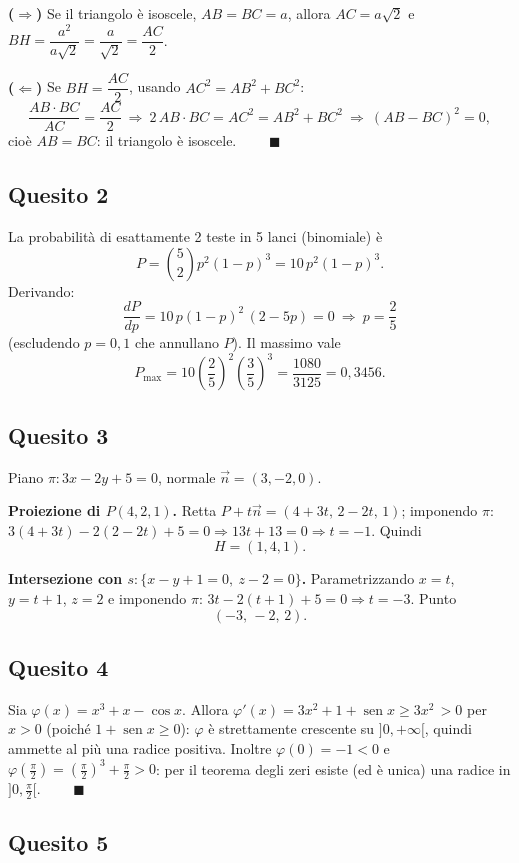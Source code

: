 \documentclass[11pt]{article}
\DeclareMathOperator{\sen}{sen}
\begin{document}
\textbf{($\Rightarrow$)} Se il triangolo \`e isoscele, $AB=BC=a$, allora
$AC=a\sqrt2$ e $BH=\dfrac{a^2}{a\sqrt2}=\dfrac{a}{\sqrt2}=\dfrac{AC}{2}$.

\textbf{($\Leftarrow$)} Se $BH=\dfrac{AC}{2}$, usando $AC^2=AB^2+BC^2$:
\[
\frac{AB\cdot BC}{AC}=\frac{AC}{2}
\ \Longrightarrow\ 2\,AB\cdot BC=AC^2=AB^2+BC^2
\ \Longrightarrow\ (AB-BC)^2=0,
\]
cio\`e $AB=BC$: il triangolo \`e isoscele. $\qquad\blacksquare$

\subsection*{Quesito 2}

La probabilit\`a di esattamente 2 teste in 5 lanci (binomiale) \`e
\[
P=\binom{5}{2}p^2(1-p)^3=10\,p^2(1-p)^3.
\]
Derivando:
\[
\frac{dP}{dp}=10\,p(1-p)^2\,(2-5p)=0\ \Longrightarrow\ p=\frac{2}{5}
\]
(escludendo $p=0,1$ che annullano $P$). Il massimo vale
\[
P_{\max}=10\left(\frac25\right)^2\left(\frac35\right)^3=\frac{1080}{3125}=0{,}3456.
\]

\subsection*{Quesito 3}

Piano $\pi\colon 3x-2y+5=0$, normale $\vec n=(3,-2,0)$.

\textbf{Proiezione di $P(4,2,1)$.} Retta $P+t\vec n=(4+3t,\,2-2t,\,1)$; imponendo
$\pi$: $3(4+3t)-2(2-2t)+5=0\Rightarrow 13t+13=0\Rightarrow t=-1$. Quindi
\[
H=(1,4,1).
\]

\textbf{Intersezione con $s\colon\{x-y+1=0,\ z-2=0\}$.} Parametrizzando $x=t$,
$y=t+1$, $z=2$ e imponendo $\pi$: $3t-2(t+1)+5=0\Rightarrow t=-3$. Punto
\[
(-3,\,-2,\,2).
\]

\newpage 
\subsection*{Quesito 4}

Sia $\varphi(x)=x^3+x-\cos x$. Allora
$\varphi'(x)=3x^2+1+\sen x\ge 3x^2\,>0$ per $x>0$ (poich\'e $1+\sen x\ge0$):
$\varphi$ \`e strettamente crescente su $]0,+\infty[$, quindi ammette al pi\`u una
radice positiva. Inoltre $\varphi(0)=-1<0$ e
$\varphi(\tfrac{\pi}{2})=\left(\tfrac{\pi}{2}\right)^3+\tfrac{\pi}{2}>0$: per il
teorema degli zeri esiste (ed \`e unica) una radice in
$]0,\tfrac{\pi}{2}[$. $\qquad\blacksquare$

\subsection*{Quesito 5}
\end{document}
